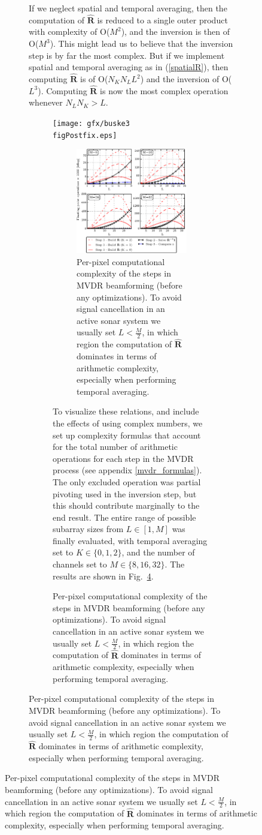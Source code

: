 \documentclass[12pt,journal,draftclsnofoot,onecolumn]{IEEEtran}
\let\MYoriglatexcaption\caption               %
\renewcommand{\caption}[2][\relax]{\MYoriglatexcaption[#2]{#2}}
\newcommand\Fig[1]{Fig.~\ref{#1}}
\newcommand\mat[1]{\boldsymbol{#1}}
\newcommand\1{\vec 1}
\newcommand*\eR{\mat{\hat R}}
\begin{document}
\begin{figure}[H]
\begin{figure}[!t]
If we neglect spatial and temporal averaging, then the computation of $\eR$ is reduced to a single outer product with complexity of O($M^2$), and the inversion is then of O($M^3$). This might lead us to believe that the inversion step is by far the most complex. But if we implement spatial and temporal averaging as in (\ref{spatialR}), then computing $\eR$ is of O($N_K N_L L^2$) and the inversion of O($L^3$). Computing $\eR$ is now the most complex operation whenever $N_LN_K>L$.
\ifPeerReview
\begin{figure}[!t]\centering
\texttt{[image: gfx/buske3\\figPostfix.eps]}
\else
\begin{figure}[!t]\centering
\includegraphics[width=\linewidth]{gfx/mvdr_complexity.eps}
\fi%
\caption{Per-pixel computational complexity of the steps in MVDR beamforming (before any optimizations). To avoid signal cancellation in an active sonar system we usually set $L<\frac{M}{2}$, in which region the computation of $\eR$ dominates in terms of arithmetic complexity, especially when performing temporal averaging.}\label{mvdr_complexity}
\end{figure}
To visualize these relations, and include the effects of using complex numbers, we set up complexity formulas that account for the total number of arithmetic operations for each step in the MVDR process (see appendix \ref{mvdr_formulas}). The only excluded operation was partial pivoting used in the inversion step, but this should contribute marginally to the end result. The entire range of possible subarray sizes from $L\in[1,M]$ was finally evaluated, with temporal averaging set to $K\in\{0,1,2\}$, and the number of channels set to $M\in\{8,16,32\}$. The results are shown in \Fig{mvdr_complexity}.


\end{figure}
\end{figure}
\end{figure}
\end{document}

